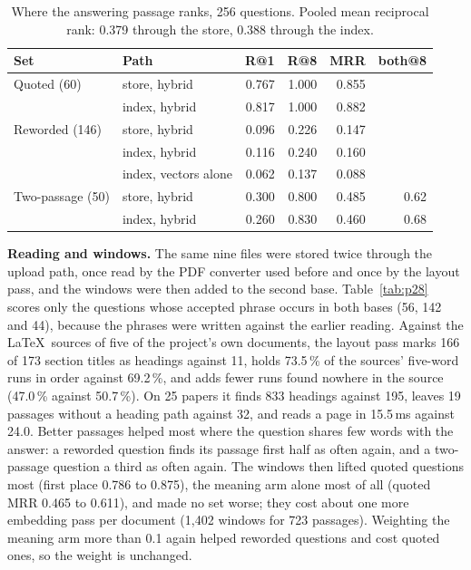 \begin{table}[t]
\centering\scriptsize
\caption{Where the answering passage ranks, 256 questions. Pooled mean reciprocal rank: 0.379 through the store, 0.388 through the index.}
\label{tab:p25acc}
\begin{tabular}{@{}llrrrr@{}}
\toprule
Set & Path & R@1 & R@8 & MRR & both@8 \\
\midrule
Quoted (60) & store, hybrid & 0.767 & 1.000 & 0.855 & \\
 & index, hybrid & 0.817 & 1.000 & 0.882 & \\
Reworded (146) & store, hybrid & 0.096 & 0.226 & 0.147 & \\
 & index, hybrid & 0.116 & 0.240 & 0.160 & \\
 & index, vectors alone & 0.062 & 0.137 & 0.088 & \\
Two-passage (50) & store, hybrid & 0.300 & 0.800 & 0.485 & 0.62 \\
 & index, hybrid & 0.260 & 0.830 & 0.460 & 0.68 \\
\bottomrule
\end{tabular}
\end{table}

\textbf{Reading and windows.} The same nine files were stored twice through
the upload path, once read by the PDF converter used before and once by the
layout pass, and the windows were then added to the second base.
Table~\ref{tab:p28} scores only the questions whose accepted phrase occurs in
both bases (56, 142 and 44), because the phrases were written against the
earlier reading. Against the \LaTeX\ sources of five of the project's own
documents, the layout pass marks 166 of 173 section titles as headings
against 11, holds 73.5\,\% of the sources' five-word runs in order against
69.2\,\%, and adds fewer runs found nowhere in the source (47.0\,\% against
50.7\,\%). On 25 papers it finds 833 headings against 195, leaves 19 passages
without a heading path against 32, and reads a page in 15.5\,ms against
24.0. Better passages helped most where the question shares few words with
the answer: a reworded question finds its passage first half as often again,
and a two-passage question a third as often again. The windows then lifted
quoted questions most (first place 0.786 to 0.875), the meaning arm alone
most of all (quoted MRR 0.465 to 0.611), and made no set worse; they cost
about one more embedding pass per document (1{,}402 windows for 723
passages). Weighting the meaning arm more than 0.1 again helped reworded
questions and cost quoted ones, so the weight is unchanged.


